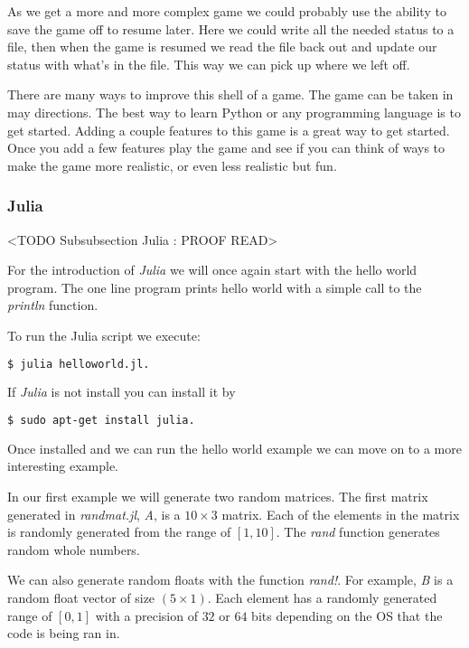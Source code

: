 As we get a more and more complex game we could probably use the ability to save the game off to resume later. Here we could write all the needed status to a file, then when the game is resumed we read the file back out and update our status with what's in the file. This way we can pick up where we left off. 

There are many ways to improve this shell of a game. The game can be taken in may directions. The best way to learn Python or any programming language is to get started. Adding a couple features to this game is a great way to get started. Once you add a few features play the game and see if you can think of ways to make the game more realistic, or even less realistic but fun.

\subsubsection{Julia}
	<TODO Subsubsection  Julia : PROOF READ>

For the introduction of \emph{Julia} we will once again start with the hello world program. The one line program prints hello world with a simple call to the \emph{println} function. 
	
	

To run the Julia script we execute:

\begin{lstlisting}[language=bash]
    $ julia helloworld.jl.
\end{lstlisting}

If \emph{Julia} is not install you can install it by 

\begin{lstlisting}[language=bash]
    $ sudo apt-get install julia.
\end{lstlisting}

Once installed and we can run the hello world example we can move on to a more interesting example. 

In our first example we will generate two random matrices. The first matrix generated in \emph{randmat.jl}, \emph{A}, is a $10\times3$ matrix. Each of the elements in the matrix is randomly generated from the range of $[1, 10]$. The \emph{rand} function generates random whole numbers. 

We can also generate random floats with the function \emph{rand!}. For example, \emph{B} is a random float vector of size $(5\times1)$. Each element has a randomly generated range of $[0,1]$ with a precision of $32$ or $64$ bits depending on the \ac{OS} that the code is being ran in. 

